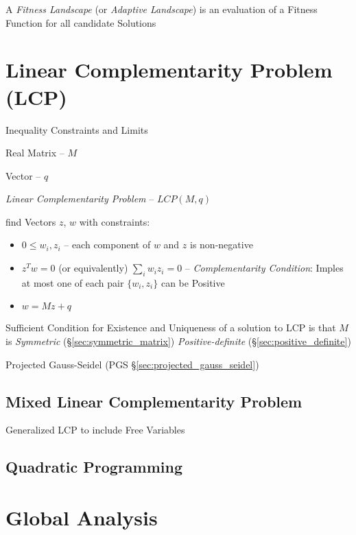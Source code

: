 A \emph{Fitness Landscape} (or \emph{Adaptive Landscape}) is an
evaluation of a Fitness Function for all candidate Solutions %



\section{Linear Complementarity Problem (LCP)}
\label{sec:linear_complementarity}


Inequality Constraints and Limits %

Real Matrix -- $M$

Vector -- $q$

\emph{Linear Complementarity Problem} -- $LCP(M,q)$

find Vectors $z$, $w$ with constraints:

\begin{itemize}
  \item $0 \leq w_i,z_i$ -- each component of $w$ and $z$ is
    non-negative
  \item $z^T w = 0$ (or equivalently) $\sum_i w_i z_i = 0$ --
    \emph{Complementarity Condition}: Imples at most one of each pair
    $\{w_i,z_i\}$ can be Positive
  \item $w = M z + q$
\end{itemize}

Sufficient Condition for Existence and Uniqueness of a solution to LCP
is that $M$ is \emph{Symmetric} (\S\ref{sec:symmetric_matrix})
\emph{Positive-definite} (\S\ref{sec:positive_definite})

\fist Projected Gauss-Seidel (PGS \S\ref{sec:projected_gauss_seidel})


\subsection{Mixed Linear Complementarity Problem}\label{sec:mlcp}

Generalized LCP to include Free Variables



\subsection{Quadratic Programming}\label{sec:quadratic_programming}



\section{Global Analysis}\label{sec:global_analysis}
